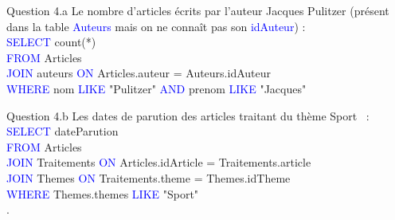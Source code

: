 \documentclass[10pt]{beamer}
\begin{document}
\begin{frame}
	\mframe{\DB}
	\begin{exampleblock}{Question 4.a}
        Le nombre d'articles écrits par l'auteur Jacques Pulitzer (présent dans la table  \textcolor{blue}{\sc Auteurs} mais on ne connaît pas son  \textcolor{blue}{\sc idAuteur}) : \\

 \textcolor{blue}{\sc SELECT} count(*) \\
 \textcolor{blue}{\sc FROM} Articles \\
 \textcolor{blue}{\sc JOIN} auteurs  \textcolor{blue}{\sc ON} Articles.auteur = Auteurs.idAuteur \\
 \textcolor{blue}{\sc WHERE} nom  \textcolor{blue}{\sc LIKE} "Pulitzer"  \textcolor{blue}{\sc AND} prenom  \textcolor{blue}{\sc LIKE} "Jacques"
	\end{exampleblock}
	\begin{exampleblock}{Question 4.b}
Les dates de parution des articles traitant du thème \og Sport \fg\ :\\

\textcolor{blue}{\sc SELECT} dateParution \\
\textcolor{blue}{\sc  FROM} Articles \\
\textcolor{blue}{\sc JOIN} Traitements \textcolor{blue}{\sc ON} Articles.idArticle = Traitements.article \\
\textcolor{blue}{\sc JOIN} Themes \textcolor{blue}{\sc ON} Traitements.theme = Themes.idTheme  \\
\textcolor{blue}{\sc WHERE} Themes.themes \textcolor{blue}{\sc LIKE} "Sport" \\
.
	\end{exampleblock}
\end{frame}
\end{document}
